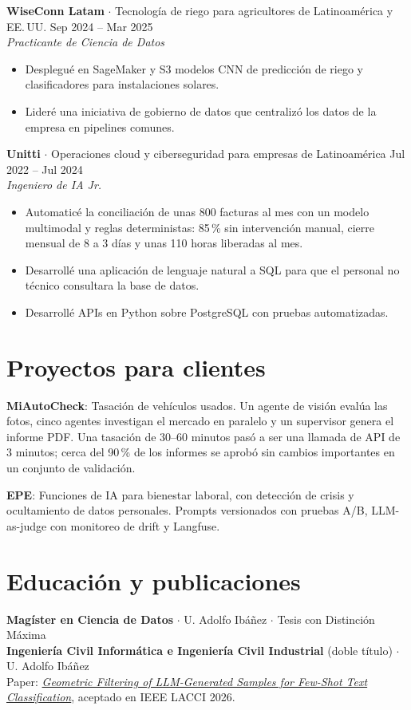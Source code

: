 \documentclass[a4paper,10pt]{article}
\begin{document}
\textbf{WiseConn Latam} $\cdot$ Tecnología de riego para agricultores de Latinoamérica y EE.\,UU. \hfill Sep 2024 -- Mar 2025\\
\textit{Practicante de Ciencia de Datos}
\begin{itemize}
\item Desplegué en SageMaker y S3 modelos CNN de predicción de riego y clasificadores para instalaciones solares.
\item Lideré una iniciativa de gobierno de datos que centralizó los datos de la empresa en pipelines comunes.
\end{itemize}
\textbf{Unitti} $\cdot$ Operaciones cloud y ciberseguridad para empresas de Latinoamérica \hfill Jul 2022 -- Jul 2024\\
\textit{Ingeniero de IA Jr.}
\begin{itemize}
\item Automaticé la conciliación de unas 800 facturas al mes con un modelo multimodal y reglas deterministas: 85\,\% sin intervención manual, cierre mensual de 8 a 3 días y unas 110 horas liberadas al mes.
\item Desarrollé una aplicación de lenguaje natural a SQL para que el personal no técnico consultara la base de datos.
\item Desarrollé APIs en Python sobre PostgreSQL con pruebas automatizadas.
\end{itemize}
\section*{Proyectos para clientes}
\textbf{MiAutoCheck}: Tasación de vehículos usados. Un agente de visión evalúa las fotos, cinco agentes investigan el mercado en paralelo y un supervisor genera el informe PDF. Una tasación de 30--60 minutos pasó a ser una llamada de API de 3 minutos; cerca del 90\,\% de los informes se aprobó sin cambios importantes en un conjunto de validación.

\textbf{EPE}: Funciones de IA para bienestar laboral, con detección de crisis y ocultamiento de datos personales. Prompts versionados con pruebas A/B, LLM-as-judge con monitoreo de drift y Langfuse.
\section*{Educación y publicaciones}
\textbf{Magíster en Ciencia de Datos} $\cdot$ U. Adolfo Ibáñez $\cdot$ Tesis con Distinción Máxima\\
\textbf{Ingeniería Civil Informática e Ingeniería Civil Industrial} (doble título) $\cdot$ U. Adolfo Ibáñez\\
Paper: \href{https://arxiv.org/abs/2608.13866}{\textit{Geometric Filtering of LLM-Generated Samples for Few-Shot Text Classification}}, aceptado en IEEE LACCI 2026.
\end{document}
